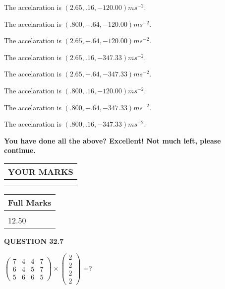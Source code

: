 \documentclass[12pt]{article}
\begin{document}
  
 
 
The accelaration is $  %
(
2.65,
.16,
-120.00)
ms^{-2} $.
 
 
The accelaration is $  %
(
.800,
-.64,
-120.00)
ms^{-2} $.
 
 
The accelaration is $  %
(
2.65,
-.64,
-120.00)
ms^{-2} $.
 
 
The accelaration is $  %
(
2.65,
.16,
-347.33)
ms^{-2} $.
 
 
The accelaration is $  %
(
2.65,
-.64,
-347.33)
ms^{-2} $.
 
 
The accelaration is $  %
(
.800,
.16,
-120.00)
ms^{-2} $.
 
 
The accelaration is $  %
(
.800,
-.64,
-347.33)
ms^{-2} $.
 
 
The accelaration is $  %
(
.800,
.16,
-347.33)
ms^{-2} $.
 
 
 

 

 
\vspace{0.3in}
   
   
\vspace{0.3in}
{\textbf{\LARGE{You have done all the above? Excellent! Not much left, please continue.}}}
\vspace{0.3in}
   
   
  
\vspace{0.2in}
  
\noindent\begin{tabular}{|l|}
\hline
 YOUR MARKS  \\
\hline
 \\ 
 \\ 
\hline
\end{tabular}
\hspace{0.05in} \begin{tabular}{|l|}
\hline
 Full Marks  \\
\hline
 \\ 
12.50 \\
\hline
\end{tabular}
{\textbf{\Large{QUESTION
32.7 
}}}
  
  
 
$ \left( \begin{array}{ccccccccc}
           7 & 
           4 & 
           4 & 
           7 \\ 
           6 & 
           4 & 
           5 & 
           7 \\ 
           5 & 
           6 & 
           6 & 
           5
\end{array}\right) \times
\left( \begin{array}{c}
           2 \\ 
           2 \\ 
           2 \\ 
           2
\end{array}\right) $ =?
 
\end{document}
